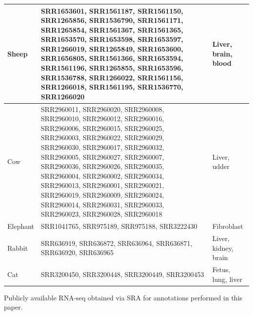 \begin{center}
\begin{longtable}{|p{}|p{}|p{}|}
Sheep   & SRR1653601, SRR1561187, SRR1561150, SRR1265856, SRR1536790, SRR1561171, SRR1265854, SRR1561367, SRR1561365, SRR1653570, SRR1653598, SRR1653597, SRR1266019, SRR1265849, SRR1653600, SRR1656805, SRR1561366, SRR1653594, SRR1561196, SRR1265855, SRR1653596, SRR1536788, SRR1266022, SRR1561156, SRR1266018, SRR1561195, SRR1536770, SRR1266020                                                 &   Liver, brain, blood                                                          \\ \hline
Cow    & SRR2960011, SRR2960020, SRR2960008, SRR2960010, SRR2960012, SRR2960016, SRR2960006, SRR2960015, SRR2960025, SRR2960003, SRR2960022, SRR2960029, SRR2960030, SRR2960017, SRR2960032, SRR2960005, SRR2960027, SRR2960007, SRR2960036, SRR2960026, SRR2960035, SRR2960004, SRR2960002, SRR2960034, SRR2960013, SRR2960001, SRR2960021, SRR2960019, SRR2960009, SRR2960024, SRR2960014, SRR2960031, SRR2960033, SRR2960023, SRR2960028, SRR2960018 &  Liver, udder                                                          \\ \hline
Elephant & SRR1041765, SRR975189, SRR975188, SRR3222430                                                                                                                                                                                                  &    Fibroblast                                                        \\ \hline
Rabbit  & SRR636919, SRR636872, SRR636964, SRR636871, SRR636920, SRR636965                                                                                                                                                                                        &     Liver, kidney, brain                                                       \\ \hline
Cat    & SRR3200450, SRR3200448, SRR3200449, SRR3200453                                                                                                                                                                                                 &   Fetus, lung, liver                            \\ \hline              
\end{longtable}
Publicly available RNA-seq obtained via SRA for annotations performed in this paper. 
\end{center}